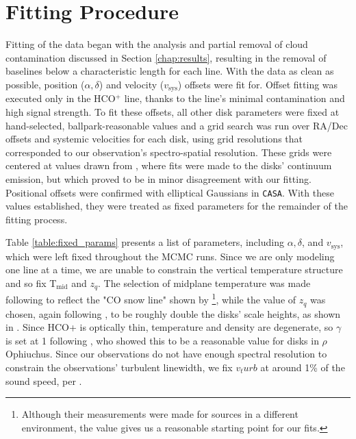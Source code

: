 \section{Fitting Procedure}
\label{section:fitting_procedure}

Fitting of the data began with the analysis and partial removal of cloud contamination discussed in Section \ref{chap:results}, resulting in the removal of baselines below a characteristic length for each line. With the data as clean as possible, position ($\alpha, \delta$) and velocity ($v_\text{sys}$) offsets were fit for. Offset fitting was executed only in the HCO$^+$ line, thanks to the line's minimal contamination and high signal strength. To fit these offsets, all other disk parameters were fixed at hand-selected, ballpark-reasonable values and a grid search was run over RA/Dec offsets and systemic velocities for each disk, using grid resolutions that corresponded to our observation's spectro-spatial resolution. These grids were centered at values drawn from \cite{Williams2014}, where fits were made to the disks' continuum emission, but which proved to be in minor disagreement with our fitting. Positional offsets were confirmed with elliptical Gaussians in \texttt{CASA}. With these values established, they were treated as fixed parameters for the remainder of the fitting process.


Table \ref{table:fixed_params} presents a list of parameters, including $\alpha, \delta$, and $v_\text{sys}$, which were left fixed throughout the MCMC runs. Since we are only modeling one line at a time, we are unable to constrain the vertical temperature structure and so fix T$_\text{mid}$ and $z_q$. The selection of midplane temperature was made following \citet{Factor2017} to reflect the "CO snow line" shown by \citet{Qi2011}\footnote{Although their measurements were made for sources in a different environment, the value gives us a reasonable starting point for our fits.}, while the value of $z_q$ was chosen, again following \citet{Factor2017}, to be roughly double the disks' scale heights, as shown in \citet{Rosenfeld2013}. Since HCO+ is optically thin, temperature and density are degenerate, so $\gamma$ is set at 1 following \cite{Andrews2009}, who showed this to be a reasonable value for disks in $\rho$ Ophiuchus. Since our observations do not have enough spectral resolution to constrain the observations' turbulent linewidth, we fix $v_turb$ at around 1\% of the sound speed, per \citet{Williams2014}.

